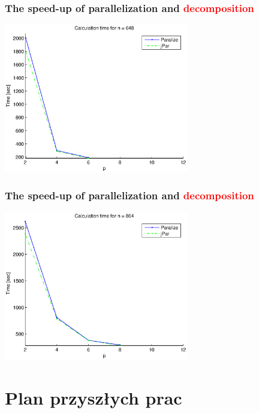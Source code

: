 \documentclass{beamer}
\begin{document}
\begin{frame}
   \frametitle{The speed-up of parallelization and \textcolor{red}{decomposition}}
   \centering
   \includegraphics[height=6.5cm]{fig4}
\end{frame}
\begin{frame}
   \frametitle{The speed-up of parallelization and \textcolor{red}{decomposition}}
   \centering
   \includegraphics[height=6.5cm]{fig5}
\end{frame}

\section{Plan przyszłych prac}
\end{document}
